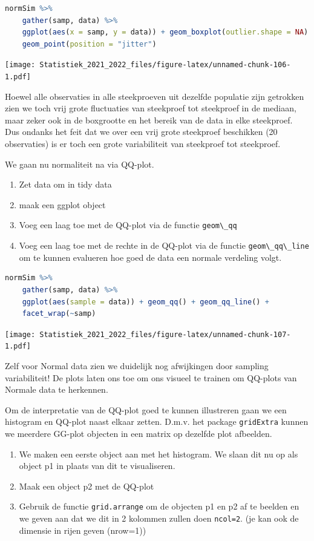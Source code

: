 \documentclass[
  12pt,dutch,coursenotes]{book}
\newcommand{\passthrough}[1]{#1}
\providecommand{\tightlist}{%
  \setlength{\itemsep}{0pt}\setlength{\parskip}{0pt}}
\theoremstyle{definition}
\theoremstyle{definition}
\theoremstyle{definition}
\theoremstyle{definition}
\theoremstyle{remark}
\begin{document}
\begin{lstlisting}[language=R]
normSim %>%
    gather(samp, data) %>%
    ggplot(aes(x = samp, y = data)) + geom_boxplot(outlier.shape = NA) +
    geom_point(position = "jitter")
\end{lstlisting}

\texttt{[image: Statistiek\_2021\_2022\_files/figure-latex/unnamed-chunk-106-1.pdf]}

Hoewel alle observaties in alle steekproeven uit dezelfde populatie zijn getrokken zien we toch vrij grote fluctuaties van steekproef tot steekproef in de mediaan, maar zeker ook in de boxgrootte en het bereik van de data in elke steekproef. Dus ondanks het feit dat we over een vrij grote steekproef beschikken (20 observaties) is er toch een grote variabiliteit van steekproef tot steekproef.

We gaan nu normaliteit na via QQ-plot.

\begin{enumerate}
\def\labelenumi{\arabic{enumi}.}
\tightlist
\item
  Zet data om in tidy data
\item
  maak een ggplot object
\item
  Voeg een laag toe met de QQ-plot via de functie \passthrough{\lstinline!geom\_qq!}
\item
  Voeg een laag toe met de rechte in de QQ-plot via de functie \passthrough{\lstinline!geom\_qq\_line!} om te kunnen evalueren hoe goed de data een normale verdeling volgt.
\end{enumerate}

\begin{lstlisting}[language=R]
normSim %>%
    gather(samp, data) %>%
    ggplot(aes(sample = data)) + geom_qq() + geom_qq_line() +
    facet_wrap(~samp)
\end{lstlisting}

\texttt{[image: Statistiek\_2021\_2022\_files/figure-latex/unnamed-chunk-107-1.pdf]}

Zelf voor Normal data zien we duidelijk nog afwijkingen door sampling variabiliteit! De plots laten ons toe om ons visueel te trainen om QQ-plots van Normale data te herkennen.

Om de interpretatie van de QQ-plot goed te kunnen illustreren gaan we een histogram en QQ-plot naast elkaar zetten.
D.m.v. het package \passthrough{\lstinline!gridExtra!} kunnen we meerdere GG-plot objecten in een matrix op dezelfde plot afbeelden.

\begin{enumerate}
\def\labelenumi{\arabic{enumi}.}
\tightlist
\item
  We maken een eerste object aan met het histogram. We slaan dit nu op als object p1 in plaats van dit te visualiseren.
\item
  Maak een object p2 met de QQ-plot
\item
  Gebruik de functie \passthrough{\lstinline!grid.arrange!} om de objecten p1 en p2 af te beelden en we geven aan dat we dit in 2 kolommen zullen doen \passthrough{\lstinline!ncol=2!}. (je kan ook de dimensie in rijen geven (nrow=1))
\end{enumerate}
\end{document}
